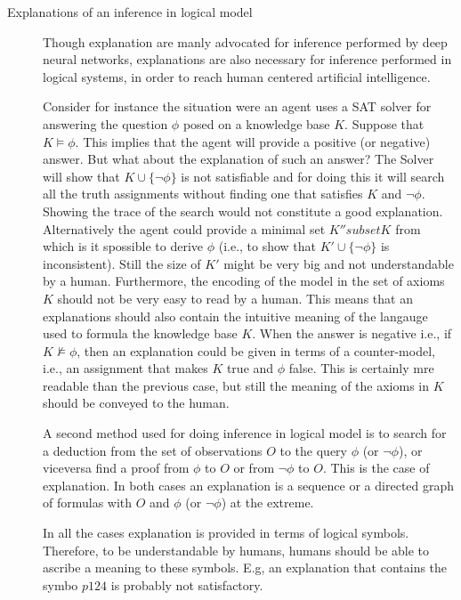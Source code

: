 \begin{description}
\item[Explanations of an inference in logical model] Though
  explanation are manly advocated for inference performed by deep
  neural networks, explanations are also necessary for inference
  performed in logical systems, in order to reach human centered
  artificial intelligence.

  Consider for instance the situation were an
  agent uses a SAT solver for answering the question $\phi$ posed on a
  knowledge base $K$. Suppose that $K\models\phi$. This implies that
  the agent will provide a positive (or negative) answer. But what
  about the explanation of such an answer?  The Solver will show that
  $K\cup\{\neg \phi\}$ is not satisfiable and for doing this it will
  search all the truth assignments without finding one that satisfies
  $K$ and $\neg\phi$. Showing the trace of the search would not
  constitute a good explanation. Alternatively the agent could provide
  a minimal set $K''subset K$ from which is it spossible to derive
  $\phi$ (i.e., to show that $K'\cup\{\neg \phi\}$ is
  inconsistent). Still the size of $K'$ might be very big and not
  understandable by a human. Furthermore, the encoding of the model in
  the set of axioms $K$ should not be very easy to read by a
  human. This means that an explanations should also contain the
  intuitive meaning of the langauge used to formula the knowledge base
  $K$. When the answer is negative i.e., if $K\not\models\phi$, then
  an explanation could be given in terms of a counter-model, i.e., an
  assignment that makes $K$ true and $\phi$ false. This is certainly
  mre readable than the previous case, but still the meaning of the
  axioms in $K$ should be conveyed to the human.

  A second method used for doing inference in logical model is to
  search for a deduction from the set of observations $O$ to the query
  $\phi$ (or $\neg\phi$), or viceversa find a proof from $\phi$ to $O$
  or from $\neg\phi$ to $O$. This is the case of explanation.
  In both cases an explanation is a sequence or a directed graph of
  formulas with $O$ and $\phi$ (or $\neg\phi$) at the extreme.

  In all the cases explanation is provided in terms of logical
  symbols. Therefore, to be understandable by humans, humans should be
  able to ascribe a meaning to these symbols. E.g, an explanation that
  contains the symbo $p124$ is probably not satisfactory. 
  

\end{description}
